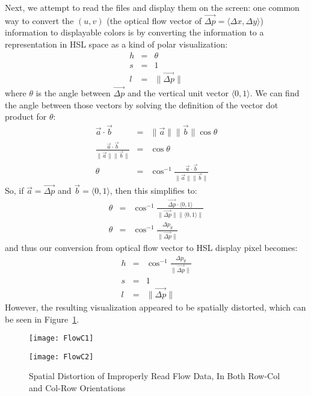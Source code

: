 Next, we attempt to read the files and display them on the screen: one common way to convert the $(u,v)$ (the optical flow vector of $\vec{\Delta p}=\langle \Delta x,\Delta y \rangle$) information to displayable colors is by converting the information to a representation in HSL space as a kind of polar visualization:
\begin{eqnarray*}
    h & = & \theta \\
    s & = & 1 \\
    l & = & \lVert \vec{\Delta p} \rVert
\end{eqnarray*}
where $\theta$ is the angle between $\vec{\Delta p}$ and the vertical unit vector $\langle 0,1 \rangle$. We can find the angle between those vectors by solving the definition of the vector dot product for $\theta$:
\begin{eqnarray*}
    \vec{a} \cdot \vec{b} & = & \lVert\vec{a}\rVert \lVert\vec{b}\rVert \cos\theta \\
    \frac{ \vec{a} \cdot \vec{b}}{\lVert\vec{a}\rVert \lVert\vec{b}\rVert} & = & \cos\theta \\
    \theta & = & \cos ^{-1} \frac{ \vec{a} \cdot \vec{b}}{\lVert \vec{a}\rVert \lVert \vec{b}\rVert}
\end{eqnarray*}
So, if $\vec{a} = \vec{\Delta p}$ and $\vec{b} = \langle 0,1 \rangle$, then this simplifies to:
\begin{eqnarray*}
    \theta & = & \cos ^{-1} \frac{ \vec{\Delta p} \cdot \langle 0,1 \rangle}{\lVert \vec{\Delta p} \rVert \lVert \langle 0,1 \rangle \rVert} \\
    \theta & = & \cos ^{-1} \frac{ {\Delta p}_y }{\lVert \vec{\Delta p} \rVert}
\end{eqnarray*}
and thus our conversion from optical flow vector to HSL display pixel becomes:
\begin{eqnarray*}
    h & = & \cos ^{-1} \frac{ {\Delta p}_y }{\lVert \vec{\Delta p} \rVert} \\
    s & = & 1 \\
    l & = & \lVert \vec{\Delta p} \rVert
\end{eqnarray*}
However, the resulting visualization appeared to be spatially distorted, which can be seen in Figure~\ref{fig:flowc}.

\begin{figure}[h]
\centering
\begin{minipage}[b]{0.4\textwidth}
    \texttt{[image: FlowC1]}
\end{minipage}
\hfill
\begin{minipage}[b]{0.4\textwidth}
    \texttt{[image: FlowC2]}
\end{minipage}
\caption{Spatial Distortion of Improperly Read Flow Data, In Both Row-Col and Col-Row Orientations}
\label{fig:flowc}
\end{figure}

